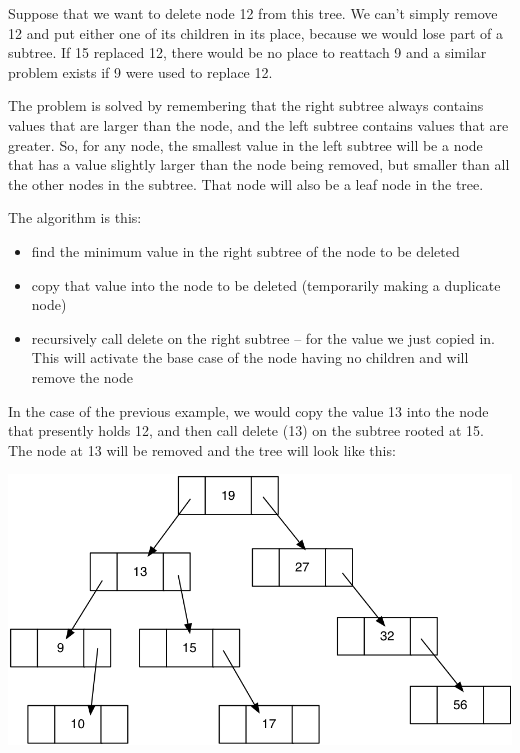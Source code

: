 Suppose that we want to delete node 12 from this tree. We can't simply
remove 12 and put either one of its children in its place, because we
would lose part of a subtree. If 15 replaced 12, there would be no place
to reattach 9 and a similar problem exists if 9 were used to replace 12.


The problem is solved by remembering that the right subtree always
contains values that are larger than the node, and the left subtree
contains values that are greater. So, for any node, the smallest value
in the left subtree will be a node that has a value slightly larger
than the node being removed, but smaller than all the other nodes in the
subtree. That node will also be a leaf node in the tree.

The algorithm is this:

\begin{itemize}
\item
  find the minimum value in the right subtree of the node to be deleted
\item
  copy that value into the node to be deleted (temporarily making a
  duplicate node)
\item
  recursively call delete on the right subtree -- for the value we just
  copied in. This will activate the base case of the node having no
  children and will remove the node
\end{itemize}

In the case of the previous example, we would copy the value 13 into the
node that presently holds 12, and then call delete (13) on the subtree
rooted at 15. The node at 13 will be removed and the tree will look like
this:

\includegraphics[width=6.00000in]{pictures/bintree8.png}

